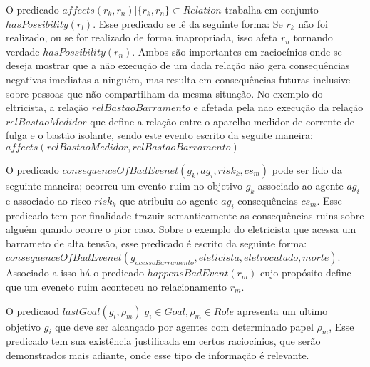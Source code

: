 O predicado $affects(r_k,r_n) | \{ r_k, r_n\} \subset Relation $ trabalha em conjunto $hasPossibility(r_l)$. Esse predicado se 
lê da seguinte forma: Se $r_k$ não foi realizado, ou se for realizado de forma inapropriada, isso afeta  $r_n$ tornando verdade 
$hasPossibility(r_n)$. Ambos são importantes em raciocínios onde se deseja mostrar que a não execução de um dada relação 
não gera consequências negativas imediatas a ninguém, mas resulta em consequências futuras inclusive sobre pessoas que não compartilham 
da mesma situação. No exemplo do eltricista, a relação $relBastaoBarramento$ e afetada pela nao execução da relação $relBastaoMedidor$ 
que define a relação entre o aparelho medidor de corrente de fulga e o bastão isolante, sendo este evento escrito da seguite maneira:
$affects(relBastaoMedidor,relBastaoBarramento)$

O predicado $consequenceOfBadEvenet(g_k, ag_i,risk_k,cs_m)$ pode ser lido da seguinte maneira; ocorreu um evento ruim no 
objetivo $g_k$ associado ao agente $ag_i$ e associado ao risco $risk_k$ que atribuiu ao agente $ag_i$ consequências $cs_m$. Esse 
predicado tem por finalidade trazuir semanticamente as consequências ruins sobre alguém quando ocorre o pior caso. Sobre o exemplo 
do eletricista que acessa um barrameto de alta tensão, esse predicado é escrito da seguinte forma:
$consequenceOfBadEvenet(g_{acessoBarramento}, eleticista,eletrocutado,morte)$. Associado a isso há o predicado $happensBadEvent(r_m)$
cujo propósito define que um eveneto ruim aconteceu no relacionamento $r_m$.

O predicaod $lastGoal(g_i,\rho_m) | g_i \in Goal, \rho_m \in Role $ apresenta um ultimo objetivo $g_i$ que deve ser alcançado 
por agentes com determinado papel $\rho_m$, Esse predicado tem sua existência justificada em certos raciocínios, que serão demonstrados 
mais adiante, onde esse tipo de informação é relevante.

